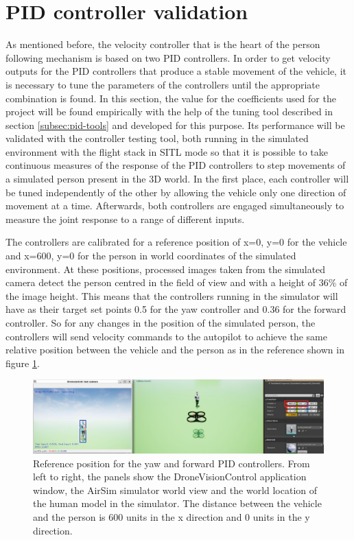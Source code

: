 \section{PID controller validation}
\label{sec:test-1-pid}


As mentioned before, the velocity controller that is the heart of the person following mechanism is based on two PID controllers.
In order to get velocity outputs for the PID controllers that produce a stable movement of the vehicle, it is necessary to tune the parameters of the controllers until the appropriate combination is found.
In this section, the value for the coefficients used for the project will be found empirically with the help of the tuning tool described in section \ref{subsec:pid-tools} and developed for this purpose. Its performance will be validated with the controller testing tool, both running in the simulated environment with the flight stack in SITL mode so that it is possible to take continuous measures of the response of the PID controllers to step movements of a simulated person present in the 3D world.
In the first place, each controller will be tuned independently of the other by allowing the vehicle only one direction of movement at a time.
Afterwards, both controllers are engaged simultaneously to measure the joint response to a range of different inputs.

The controllers are calibrated for a reference position of x=0, y=0 for the vehicle and x=600, y=0 for the person in world coordinates of the simulated environment.
At these positions, processed images taken from the simulated camera detect the person centred in the field of view and with a height of 36\% of the image height.
This means that the controllers running in the simulator will have as their target set points 0.5 for the yaw controller and 0.36 for the forward controller. 
So for any changes in the position of the simulated person, the controllers will send velocity commands to the autopilot to achieve the same relative position between the vehicle and the person as in the reference shown in figure \ref{fig:tune-start-pos}.

\begin{figure}
  \centering
  \includegraphics[width=\textwidth, keepaspectratio]{img/pid/tune-ref-pos.jpg}
  \caption{Reference position for the yaw and forward PID controllers. From left to right, the panels show the DroneVisionControl application window, the AirSim simulator world view and the world location of the human model in the simulator. The distance between the vehicle and the person is 600 units in the x direction and 0 units in the y direction.}
  \label{fig:tune-start-pos}
\end{figure}


